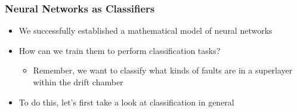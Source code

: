 

\begin{frame}
  \frametitle{Neural Networks as Classifiers}
  \begin{itemize}
    \item We successfully established a mathematical model of neural
      networks
    \item How can we train them to perform classification tasks?
      \begin{itemize}
        \item Remember, we want to classify what kinds of faults are
          in a superlayer within the drift chamber
      \end{itemize}
    \item To do this, let's first take a look at classification in general
  \end{itemize}
\end{frame}

